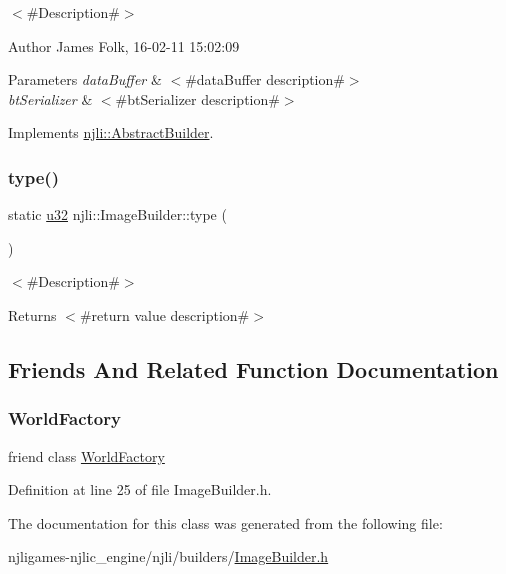 $<$\#\+Description\#$>$ 

\begin{DoxyAuthor}{Author}
James Folk, 16-\/02-\/11 15\+:02\+:09
\end{DoxyAuthor}

\begin{DoxyParams}{Parameters}
{\em data\+Buffer} & $<$\#data\+Buffer description\#$>$ \\
\hline
{\em bt\+Serializer} & $<$\#bt\+Serializer description\#$>$ \\
\hline
\end{DoxyParams}


Implements \mbox{\hyperlink{classnjli_1_1_abstract_builder_ab66b774e02ccb9da554c9aab7fa6d981}{njli\+::\+Abstract\+Builder}}.

\mbox{\label{classnjli_1_1_image_builder_af77acf29a3dfbb5d35ef115ba97632f3}} 
\subsubsection{\texorpdfstring{type()}{type()}}
{\footnotesize\ttfamily static \mbox{\hyperlink{_util_8h_a10e94b422ef0c20dcdec20d31a1f5049}{u32}} njli\+::\+Image\+Builder\+::type (\begin{DoxyParamCaption}{ }\end{DoxyParamCaption})\hspace{0.3cm}{\ttfamily [static]}}

$<$\#\+Description\#$>$

\begin{DoxyReturn}{Returns}
$<$\#return value description\#$>$ 
\end{DoxyReturn}


\subsection{Friends And Related Function Documentation}
\mbox{\label{classnjli_1_1_image_builder_acb96ebb09abe8f2a37a915a842babfac}} 
\subsubsection{\texorpdfstring{World\+Factory}{WorldFactory}}
{\footnotesize\ttfamily friend class \mbox{\hyperlink{classnjli_1_1_world_factory}{World\+Factory}}\hspace{0.3cm}{\ttfamily [friend]}}



Definition at line 25 of file Image\+Builder.\+h.



The documentation for this class was generated from the following file\+:\begin{DoxyCompactItemize}
\item 
njligames-\/njlic\+\_\+engine/njli/builders/\mbox{\hyperlink{_image_builder_8h}{Image\+Builder.\+h}}\end{DoxyCompactItemize}
